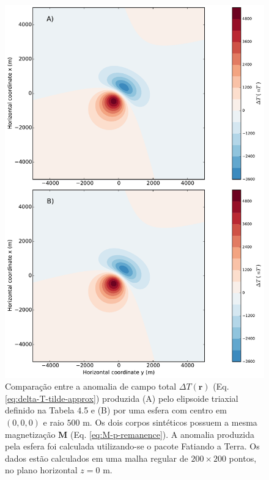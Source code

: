 \begin{figure}[hbt!]
	\centering \includegraphics[width=14.5 cm,height=22 cm]{figures/ellipsoid_triaxial_sphere}
	\caption[Comparação entre a anomalia de campo total $\Delta T (\mathbf{r})$ (Eq. \ref{eq:delta-T-tilde-approx}) produzida (A) pelo elipsoide triaxial definido na Tabela 4.5 e (B) por uma esfera com centro em $(0, 0, 1000)$ e raio $500$ m. Os dois corpos sintéticos possuem a mesma magnetização $\mathbf{M}$ (Eq. \ref{eq:M-p-remanence}). A anomalia produzida pela esfera foi calculada utilizando-se o pacote Fatiando a Terra. Os dados estão calculados em uma malha regular de $200 \times 200$ pontos, no plano horizontal $z = 0$ m.]{Comparação entre a anomalia de campo total $\Delta T (\mathbf{r})$ (Eq. \ref{eq:delta-T-tilde-approx}) produzida (A) pelo elipsoide triaxial definido na Tabela 4.5 e (B) por uma esfera com centro em $(0, 0, 0)$ e raio $500$ m. Os dois corpos sintéticos possuem a mesma magnetização $\mathbf{M}$ (Eq. \ref{eq:M-p-remanence}). A anomalia produzida pela esfera foi calculada utilizando-se o pacote Fatiando a Terra. Os dados estão calculados em uma malha regular de $200 \times 200$ pontos, no plano horizontal $z = 0$ m.}
	\label{fig:triaxial_sphere}
\end{figure}

